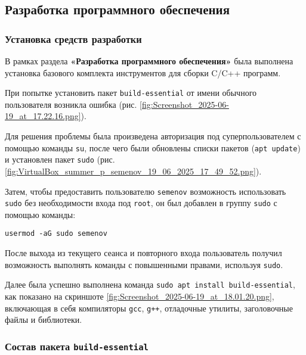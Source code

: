 \subsection{Разработка программного обеспечения}

\subsubsection{Установка средств разработки}

В рамках раздела \textbf{«Разработка программного обеспечения»} была выполнена установка базового комплекта инструментов для сборки C/C++ программ.

При попытке установить пакет \texttt{build-essential} от имени обычного пользователя возникла ошибка (рис. \ref{fig:Screenshot_2025-06-19_at_17.22.16.png}). 


Для решения проблемы была произведена авторизация под суперпользователем с помощью команды \texttt{su}, после чего были обновлены списки пакетов (\texttt{apt update}) и установлен пакет \texttt{sudo} (рис. \ref{fig:VirtualBox_summer_p_semenov_19_06_2025_17_49_52.png}). 


Затем, чтобы предоставить пользователю \texttt{semenov} возможность использовать \texttt{sudo} без необходимости входа под \texttt{root}, он был добавлен в группу \texttt{sudo} с помощью команды:

\begin{verbatim}
usermod -aG sudo semenov
\end{verbatim}

После выхода из текущего сеанса и повторного входа пользователь получил возможность выполнять команды с повышенными правами, используя \texttt{sudo}.

Далее была успешно выполнена команда \texttt{sudo apt install build-essential}, как показано на скриншоте \ref{fig:Screenshot_2025-06-19_at_18.01.20.png}, включающая в себя компиляторы \texttt{gcc}, \texttt{g++}, отладочные утилиты, заголовочные файлы и библиотеки.


\subsubsection*{Состав пакета \texttt{build-essential}}

